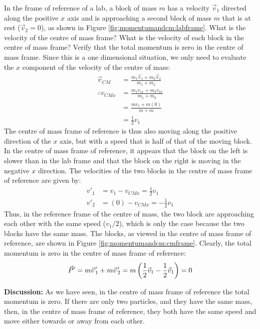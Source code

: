 \begin{example}{ In the frame of reference of a lab, a block of mass $m$ has a velocity $\vec v_1$ directed along the positive $x$ axis and is approaching a second block of mass $m$ that is at rest ($\vec v_2=0$), as shown in Figure \ref{fig:momentumandcm:labframe}. What is the velocity of the centre of mass frame? What is the velocity of each block in the centre of mass frame? Verify that the total momentum is zero in the centre of mass frame.}
Since this is a one dimensional situation, we only need to evaluate the $x$ component of the velocity of the centre of mass:
\begin{align*}
\vec v_{CM} &= \frac{m_1\vec v_1 + m_2\vec v_2 }{m_1+m_2}\\
\therefore v_{CMx} &= \frac{m_1 v_{1x} + m_2 v_{2x}}{m_1+m_2}\\
&=\frac{mv_1 + m(0) }{m+m}\\
&=\frac{1}{2}v_1
\end{align*}
The centre of mass frame of reference is thus also moving along the positive direction of the $x$ axis, but with a speed that is half of that of the moving block. In the centre of mass frame of reference, it appears that the block on the left is slower than in the lab frame and that the block on the right is moving in the negative $x$ direction. The velocities of the two blocks in the centre of mass frame of reference are given by:
\begin{align*}
v'_1&=v_1-v_{CMx}=\frac{1}{2}v_1\\
v'_2&=(0)-v_{CMx}=-\frac{1}{2}v_1
\end{align*}
Thus, in the reference frame of the centre of mass, the two block are approaching each other with the same speed ($v_1/2$), which is only the case because the two blocks have the same mass. The blocks, as viewed in the centre of mass frame of reference, are shown in Figure \ref{fig:momentumandcm:cmframe}.
Clearly, the total momentum is zero in the centre of mass frame of reference:
\begin{align*}
\vec P' = m\pvec v'_1+ m\pvec v'_2 = m \left(\frac{1}{2}\vec v_1 - \frac{1}{2}\vec v_1\right) = 0
\end{align*}

\textbf{Discussion:} As we have seen, in the centre of mass frame of reference the total momentum is zero. If there are only two particles, and they have the same mass, then, in the centre of mass frame of reference, they both have the same speed and move either towards or away from each other. 
\end{example}

